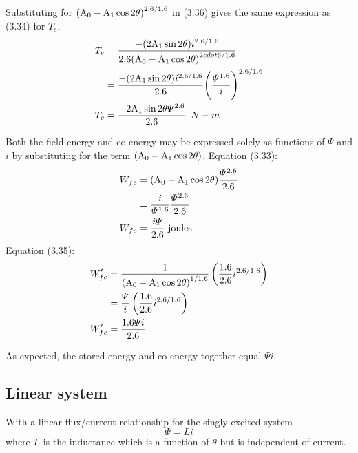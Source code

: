 \documentclass[a4paper,numbers=noenddot,12pt]{scrbook}
\begin{document}
            Substituting for ${(\textup{A}_0 - \textup{A}_1 \cos 2 \theta)}^{2.6 / 1.6}$ in (3.36) gives the same expression as (3.34) for $T_e$,
            \begin{align*}
                T_e & = \dfrac{-(2 \textup{A}_1 \sin 2 \theta)i^{2.6 / 1.6}}{2.6 {(\textup{A}_0 - \textup{A}_1 \cos 2 \theta)}^{2 cdot 6 / 1.6}} \\
                & = \dfrac{-(2 \textup{A}_1 \sin 2 \theta)i^{2.6 / 1.6}}{2.6} {\left( \dfrac{\varPsi^{1.6}}{i} \right)}^{2.6 / 1.6} \\
                T_e & = \dfrac{-2 \textup{A}_1 \sin 2 \theta \varPsi^{2.6}}{2.6} \enspace N - m 
            \end{align*}

            Both the field energy and co-energy may be expressed solely as functions of $\varPsi$ and $i$ by substituting for the term $(\textup{A}_0 - \textup{A}_1 \cos 2\theta)$. Equation (3.33):
            \begin{align}
                W_{fe} & = (\textup{A}_0 - \textup{A}_1 \cos 2 \theta)\dfrac{\varPsi^{2.6}}{2.6} \nonumber \\
                & = \dfrac{i}{\varPsi^{1.6}} \dfrac{\varPsi^{2.6}}{2.6} \nonumber \\
                W_{fe} & = \dfrac{i \varPsi}{2.6} \  \text{joules}
                \label{eq:Eq3-37}
            \end{align}
            Equation (3.35):
            \begin{align}
                W_{fe}' & = \dfrac{1}{{(\textup{A}_0 - \textup{A}_1 \cos 2 \theta)}^{1 /1.6}}\left( \dfrac{1.6}{2.6} i^{2.6 / 1.6} \right) \nonumber \\
                & = \dfrac{\varPsi}{i} \left( \dfrac{1.6}{2.6} i^{2.6 / 1.6}\right) \nonumber\\
                W_{fe}' & = \dfrac{1.6 \varPsi i}{2.6}
                \label{eq:Eq3.38}
            \end{align}

            As expected, the stored energy and co-energy together equal $\varPsi i$.
            \subsection{Linear system}
            With a linear flux/current relationship for the singly-excited system
            \begin{equation}
                \varPsi = Li
                \label{eq:Eq3.39}
            \end{equation}
            where $L$ is the inductance which is a function of $\theta$ but is independent of current.
\end{document}
